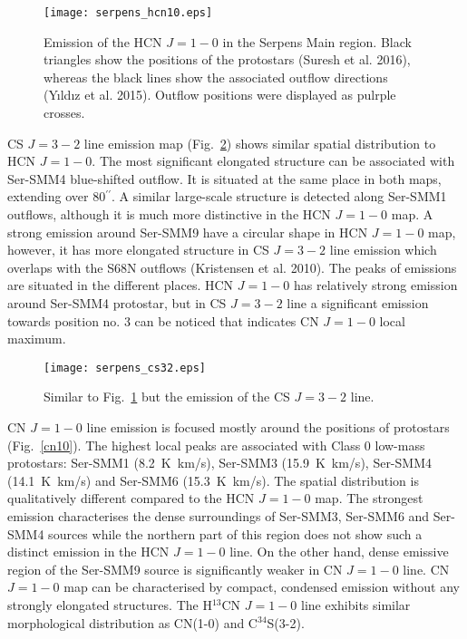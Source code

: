 \documentclass{aa}
\begin{document}
\begin{figure}
   \centering
   \texttt{[image: serpens\_hcn10.eps]}
      \caption{Emission of the HCN $J=1-0$ in the Serpens Main region. Black triangles show the positions of the protostars (Suresh et al. 2016), whereas the black lines show the associated outflow directions (Y{\i}ld{\i}z et al. 2015). Outflow positions were displayed as pulrple crosses.}
         \label{hcn10}
   \end{figure}

CS $J=3-2$ line emission map (Fig.~\ref{cs32}) shows similar spatial distribution to HCN $J=1-0$. The most significant elongated structure can be associated with Ser-SMM4 blue-shifted outflow. It is situated at the same place in both maps, extending over 80$^{\prime\prime}$. A similar large-scale structure is detected along Ser-SMM1 outflows, although it is much more distinctive in the HCN $J=1-0$ map. A strong emission around Ser-SMM9 have a circular shape in HCN $J=1-0$ map, however, it has more elongated structure in CS $J=3-2$ line emission which overlaps with the S68N outflows (Kristensen et al. 2010). The peaks of emissions are situated in the different places. HCN $J=1-0$ has relatively strong emission around Ser-SMM4 protostar, but in CS $J=3-2$ line a significant emission towards position no. 3 can be noticed that indicates CN $J=1-0$ local maximum. 

\begin{figure}
\texttt{[image: serpens\_cs32.eps]}
\caption{Similar to Fig.~\ref{hcn10} but the emission of the CS $J=3-2$ line.}
\label{cs32}
\end{figure}

CN $J=1-0$ line emission is focused mostly around the positions of protostars (Fig.~\ref{cn10}). 
The highest local peaks are associated with Class 0 low-mass protostars: Ser-SMM1 (8.2~K~km/s), Ser-SMM3 (15.9~K~km/s), Ser-SMM4 (14.1~K~km/s) and Ser-SMM6 (15.3~K~km/s). The spatial distribution is qualitatively different compared to the HCN $J=1-0$ map. The strongest emission characterises the dense surroundings of Ser-SMM3, Ser-SMM6 and Ser-SMM4 sources while the northern part of this region does not show such a distinct emission in the HCN $J=1-0$ line. On the other hand, dense emissive region of the Ser-SMM9 source is significantly weaker in CN $J=1-0$ line. CN $J=1-0$ map can be characterised by compact, condensed emission without any strongly elongated structures. The H$^{13}$CN $J=1-0$ line exhibits similar morphological distribution as CN(1-0) and \mbox{C$^{34}$S(3-2)}. 
\end{document}
